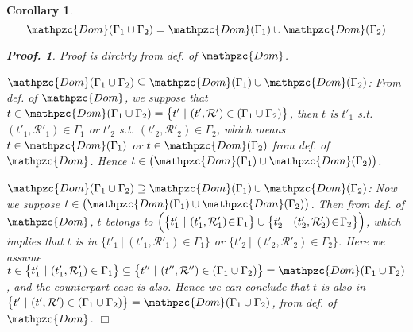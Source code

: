 \documentclass[12pt]{article}
\newtheorem{Corollary}{Corollary}[section]
\newtheorem{Proof}{Proof.}
\begin{document}
\begin{Corollary} \label{dom_bin_join}
  \[ \mathpzc{Dom}(\Gamma_1 \cup \Gamma_2) =
      \mathpzc{Dom}(\Gamma_1) \cup \mathpzc{Dom}(\Gamma_2)
  \]
  \begin{Proof}
    Proof is dirctrly from def. of $\mathpzc{Dom}$.
    
    $\mathpzc{Dom}(\Gamma_1 \cup \Gamma_2) \subseteq
    \mathpzc{Dom}(\Gamma_1) \cup \mathpzc{Dom}(\Gamma_2)$:
    From def. of $\mathpzc{Dom}$, we suppose that
    $t \in \mathpzc{Dom}(\Gamma_1 \cup \Gamma_2) =
    \bigl\{t' \ |\ (t', \mathcal{R}') \in (\Gamma_1 \cup \Gamma_2)
    \bigr\}$, then $t$ is $t'_1$ s.t. $(t'_1, \mathcal{R}'_1) \in \Gamma_1$
    or $t'_2$ s.t. $(t'_2, \mathcal{R}'_2) \in \Gamma_2$, which means
    $t \in \mathpzc{Dom}(\Gamma_1)$ or $t \in \mathpzc{Dom}(\Gamma_2)$ from
    def. of $\mathpzc{Dom}$. Hence
    $t \in \bigl(\mathpzc{Dom}(\Gamma_1) \cup \mathpzc{Dom}(\Gamma_2) \bigr)$.
    
    $\mathpzc{Dom}(\Gamma_1 \cup \Gamma_2) \supseteq
    \mathpzc{Dom}(\Gamma_1) \cup \mathpzc{Dom}(\Gamma_2)$:
    Now we suppose $t \in \bigl(\mathpzc{Dom}(\Gamma_1) \cup
    \mathpzc{Dom}(\Gamma_2) \bigr)$. Then from def. of $\mathpzc{Dom}$,
    $t$ belongs to $\Bigl(\bigl\{ t'_1 \ |\ (t'_1, \mathcal{R}'_1) \!\in\!
    \Gamma_1 \bigr\} \cup \bigl\{ t'_2 \ |\ (t'_2, \mathcal{R}'_2) \!\in\!
    \Gamma_2 \bigr\} \Bigr)$, which implies that
    $t$ is in $\bigl\{ t'_1 \ |\ (t'_1, \mathcal{R}'_1) \in \Gamma_1 \bigr\}$
    or $\bigl\{ t'_2 \ |\ (t'_2, \mathcal{R}'_2) \in \Gamma_2 \bigr\}$.
    Here we assume $t \in \bigl\{ t'_1 \ |\ (t'_1, \mathcal{R}'_1) \in
    \Gamma_1 \bigr\} \subseteq \bigl\{ t'' \ |\ (t'', \mathcal{R}'') \in
    (\Gamma_1 \cup \Gamma_2) \bigr\} = \mathpzc{Dom}(\Gamma_1 \cup
    \Gamma_2)$, and the counterpart case is also. Hence
    we can conclude that $t$ is also in
    $\bigl\{ t' \ |\ (t', \mathcal{R}') \in (\Gamma_1 \cup \Gamma_2)
    \bigr\} = \mathpzc{Dom}(\Gamma_1 \cup \Gamma_2)$, from def. of
    $\mathpzc{Dom}$.
    $\Box$
  \end{Proof}
\end{Corollary}
\end{document}
